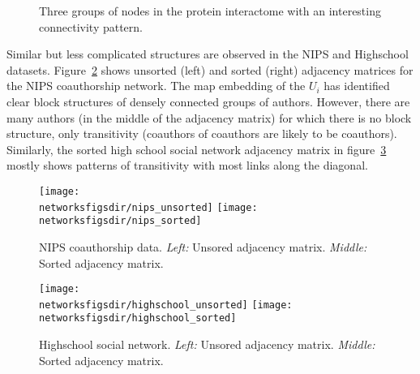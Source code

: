\begin{figure}[ht]
  \centering
{}
  \caption{Three groups of nodes in the protein interactome with an interesting connectivity pattern.}
  \label{fig:networks:butterfly}
\end{figure}

Similar but less complicated structures are observed in the NIPS and Highschool datasets.
Figure~\ref{fig:networks:nips} shows unsorted (left) and sorted (right) adjacency matrices for the NIPS coauthorship network.
The map embedding of the $U_i$ has identified clear block structures of densely connected groups of authors.
However, there are many authors (in the middle of the adjacency matrix) for which there is no block structure, only transitivity (coauthors of coauthors are likely to be coauthors).
Similarly, the sorted high school social network adjacency matrix in figure~\ref{fig:networks:highschool} mostly shows patterns of transitivity with most links along the diagonal.

\begin{figure}[ht]
  \centering
  \texttt{[image: \\networksfigsdir/nips\_unsorted]}
  \texttt{[image: \\networksfigsdir/nips\_sorted]}
  \caption{NIPS coauthorship data. 
    \emph{Left:} Unsored adjacency matrix. 
    \emph{Middle:} Sorted adjacency matrix.
  }
  \label{fig:networks:nips}
\end{figure}

\begin{figure}[ht]
  \centering
  \texttt{[image: \\networksfigsdir/highschool\_unsorted]}
  \texttt{[image: \\networksfigsdir/highschool\_sorted]}
  \caption{Highschool social network. 
    \emph{Left:} Unsored adjacency matrix. 
    \emph{Middle:} Sorted adjacency matrix.
  }
  \label{fig:networks:highschool}
\end{figure}

